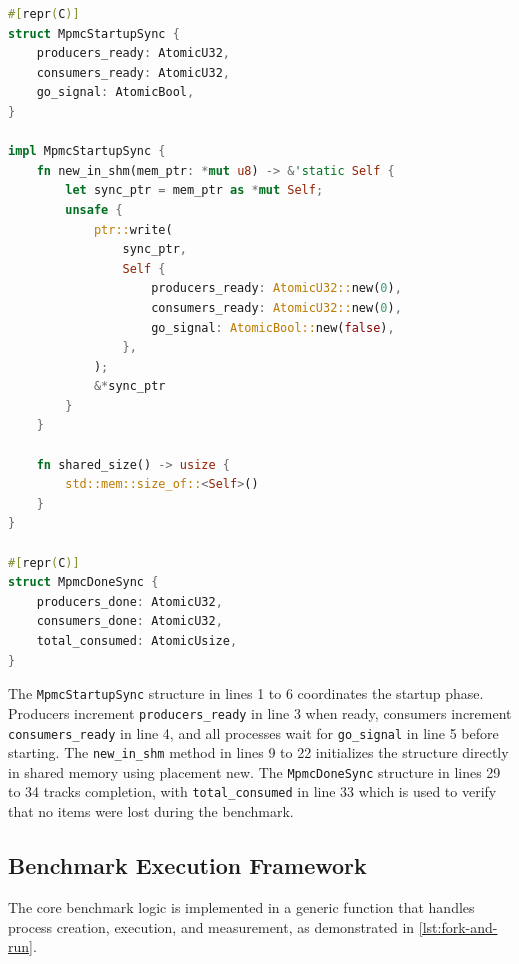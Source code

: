 \begin{lstlisting}[language=Rust, style=boxed, caption={Process synchronization structures}, label={lst:sync-structures}]
#[repr(C)]
struct MpmcStartupSync {
    producers_ready: AtomicU32,
    consumers_ready: AtomicU32,
    go_signal: AtomicBool,
}

impl MpmcStartupSync {
    fn new_in_shm(mem_ptr: *mut u8) -> &'static Self {
        let sync_ptr = mem_ptr as *mut Self;
        unsafe {
            ptr::write(
                sync_ptr,
                Self {
                    producers_ready: AtomicU32::new(0),
                    consumers_ready: AtomicU32::new(0),
                    go_signal: AtomicBool::new(false),
                },
            );
            &*sync_ptr
        }
    }

    fn shared_size() -> usize {
        std::mem::size_of::<Self>()
    }
}

#[repr(C)]
struct MpmcDoneSync {
    producers_done: AtomicU32,
    consumers_done: AtomicU32,
    total_consumed: AtomicUsize,
}
\end{lstlisting}

The \texttt{MpmcStartupSync} structure in lines 1 to 6 coordinates the startup phase. Producers increment \texttt{producers\_ready} in line 3 when ready, consumers increment \texttt{consumers\_ready} in line 4, and all processes wait for \texttt{go\_signal} in line 5 before starting. The \texttt{new\_in\_shm} method in lines 9 to 22 initializes the structure directly in shared memory using placement new. The \texttt{MpmcDoneSync} structure in lines 29 to 34 tracks completion, with \texttt{total\_consumed} in line 33 which is used to verify that no items were lost during the benchmark.

\subsection{Benchmark Execution Framework}

The core benchmark logic is implemented in a generic function that handles process creation, execution, and measurement, as demonstrated in \cref{lst:fork-and-run}.

